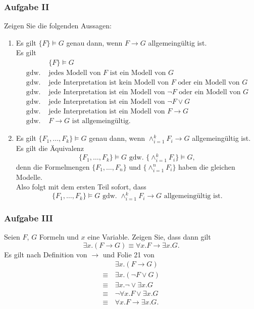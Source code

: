 \subsubsection*{Aufgabe II}
Zeigen Sie die folgenden Aussagen:
\begin{enumerate}
        \item Es gilt $\{F\} \models G$ genau dann, wenn $F \to G$ allgemeingültig ist.\\
        \LOES Es gilt
        \begin{align*}
        &\{F\} \models G \\
        \text{gdw. } &\text{jedes Modell von } F \text{ ist ein Modell von } G \\
        \text{gdw. } &\text{jede Interpretation ist kein Modell von } F \text{ oder ein Modell von } G \\
        \text{gdw. } &\text{jede Interpretation ist ein Modell von } \lnot F \text{ oder ein Modell von } G \\
        \text{gdw. } &\text{jede Interpretation ist ein Modell von } \lnot F \lor G  \\
        \text{gdw. } &\text{jede Interpretation ist ein Modell von } F \to G \\
        \text{gdw. } & F \to G \text{ ist allgemeingültig. }
        \end{align*}
        \item Es gilt $\{F_1,\dots,F_k\} \models G$ genau dann, wenn $\land_{i=1}^k F_i \to G$ allgemeingültig ist. \\
        \LOES Es gilt die Äquivalenz
        \begin{equation*}
        \{F_1, \dots ,F_k\} \models G \text{ gdw. } \{\land_{i=1}^k F_i\} \models G,
        \end{equation*}
        denn die Formelmengen $\{F_1,\dots ,F_n \}$ und $\{ \land_{i=1}^n F_i \}$ haben die gleichen Modelle. \\
        Also folgt mit dem ersten Teil sofort, dass
        \begin{equation*}
        \{ F_1, \dots , F_k \} \models G \text{ gdw. } \land_{i=1}^k F_i \to G \text{ allgemeingültig ist.}
        \end{equation*}
\end{enumerate}

\subsubsection*{Aufgabe III}
Seien $F$, $G$ Formeln und $x$ eine Variable. Zeigen Sie, dass dann gilt
\begin{equation*}
\exists x.(F \to G) \equiv \forall x. F \to \exists x. G.
\end{equation*}
\LOES Es gilt nach Definition von $\to$ und Folie 21 von 
\begin{align*}
& \exists x.(F \to G) \\
\equiv \,& \exists x.(\lnot F \lor G) \\
\equiv \,& \exists x.\lnot \lor \exists x.G \\
\equiv \,& \lnot \forall x.F \lor \exists x.G \\
\equiv \,& \forall x.F \to \exists x.G.
\end{align*}


